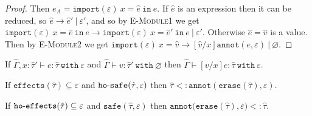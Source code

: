 \documentclass{llncs}
\newcommand{\keywadj}[1]{\mathtt{#1}}
\newcommand{\keyw}[1]{\keywadj{#1}~}
\newcommand{\kw}[1]{\keyw{ #1 }}
\newcommand{\kwa}[1]{\keywadj{ #1 }}
\newcommand{\hyphen}{\hbox{-}}
\newcommand{\safe}[2]{ \kwa{safe}(#1, #2) }
\newcommand{\module}[0]{
\kwa{import}(\varepsilon)~x = \hat e~\kwa{in}~e
}
\begin{document}
\begin{proof}
\noindent
{}
Then $e_A = \module$. If $\hat e$ is an expression then it can be reduced, so $\hat e \longrightarrow \hat e' ~|~\varepsilon'$, and so by \textsc{E-Module1} we get $\module \longrightarrow \kwa{import}(\varepsilon)~x = \hat e'~\kw{in} e ~|~\varepsilon'$. Otherwise $\hat e = \hat v$ is a value. Then by \textsc{E-Module2} we get $\kwa{import}(\varepsilon)~x = \hat v \longrightarrow [\hat v/x]\kwa{annot}(e, \varepsilon)~|~\varnothing$.
\end{proof}

\hrulefill

\begin{lemma}[Substitution]
If $\hat \Gamma, x: \hat \tau' \vdash e: \hat \tau~\kw{with} \varepsilon$ and $\hat \Gamma \vdash v: \hat \tau'~\kw{with} \varnothing$ then $\hat \Gamma \vdash [v/x]e: \hat \tau~\kw{with} \varepsilon$.
\end{lemma}

\hrulefill


\begin{lemma}
If $\kwa{effects}(\hat \tau) \subseteq \varepsilon$ and $\kwa{ho \hyphen safe}(\hat \tau, \varepsilon)$ then $\hat \tau <: \kwa{annot}(\kwa{erase}(\hat \tau), \varepsilon)$.
\end{lemma}

\begin{lemma}
If $\kwa{ho \hyphen effects}(\hat \tau) \subseteq \varepsilon$ and $\safe{\hat \tau}{\varepsilon}$ then $\kwa{annot(erase}(\hat \tau), \varepsilon) <: \hat \tau$.
\end{lemma}
\end{document}
